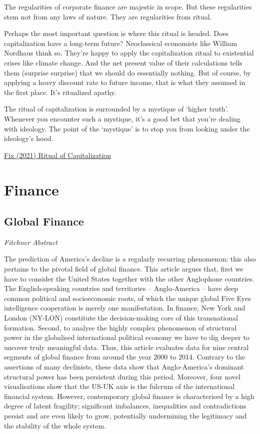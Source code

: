 \documentclass[
]{book}
\begin{document}
The regularities of corporate finance are majestic in scope. But these regularities stem not from any laws of nature. They are regularities from ritual.

Perhaps the most important question is where this ritual is headed. Does capitalization have a long-term future? Neoclassical economists like William Nordhaus think so. They're happy to apply the capitalization ritual to existential crises like climate change. And the net present value of their calculations tells them (surprise surprise) that we should do essentially nothing. But of course, by applying a heavy discount rate to future income, that is what they assumed in the first place. It's ritualized apathy.

The ritual of capitalization is surrounded by a mystique of `higher truth'. Whenever you encounter such a mystique, it's a good bet that you're dealing with ideology. The point of the `mystique' is to stop you from looking under the ideology's hood.

\href{https://economicsfromthetopdown.com/2021/06/02/the-ritual-of-capitalization/}{Fix (2021) Ritual of Capitalization}

\hypertarget{finance-1}{%
\chapter{Finance}\label{finance-1}}

\hypertarget{global-finance}{%
\section{Global Finance}\label{global-finance}}

\emph{Fitchner Abstract}

The prediction of America's decline is a regularly recurring phenomenon; this also pertains to the
pivotal field of global finance. This article argues that, first we have to consider the United States
together with the other Anglophone countries. The English-speaking countries and territories --
Anglo-America -- have deep common political and socioeconomic roots, of which the unique global Five
Eyes intelligence cooperation is merely one manifestation. In finance, New York and London
(NY-LON) constitute the decision-making core of this transnational formation. Second, to analyse the
highly complex phenomenon of structural power in the globalised international political economy we
have to dig deeper to uncover truly meaningful data. Thus, this article evaluates data for nine central
segments of global finance from around the year 2000 to 2014. Contrary to the assertions of many
declinists, these data show that Anglo-America's dominant structural power has been persistent during
this period. Moreover, four novel visualisations show that the US-UK axis is the fulcrum of the
international financial system. However, contemporary global finance is characterised by a high degree
of latent fragility; significant imbalances, inequalities and contradictions persist and are even likely to
grow, potentially undermining the legitimacy and the stability of the whole system.
\end{document}
